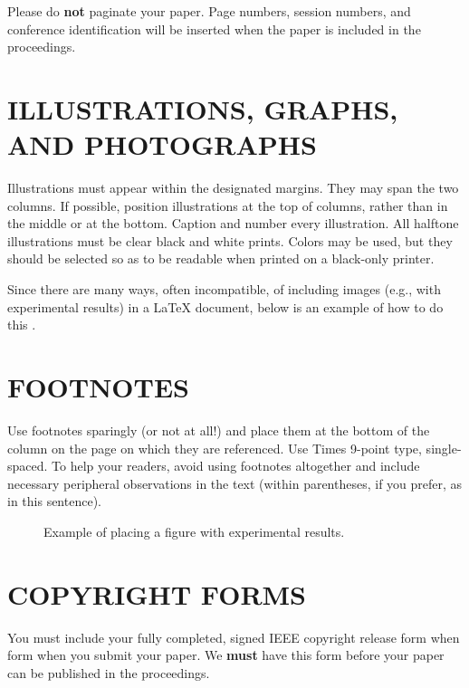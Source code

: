 \documentclass{article}
\begin{document}
Please do {\bf not} paginate your paper.  Page numbers, session numbers, and
conference identification will be inserted when the paper is included in the
proceedings.

\section{ILLUSTRATIONS, GRAPHS, AND PHOTOGRAPHS}
\label{sec:illust}

Illustrations must appear within the designated margins.  They may span the two
columns.  If possible, position illustrations at the top of columns, rather
than in the middle or at the bottom.  Caption and number every illustration.
All halftone illustrations must be clear black and white prints.  Colors may be
used, but they should be selected so as to be readable when printed on a
black-only printer.

Since there are many ways, often incompatible, of including images (e.g., with
experimental results) in a LaTeX document, below is an example of how to do
this \cite{Lamp86}.

\section{FOOTNOTES}
\label{sec:foot}

Use footnotes sparingly (or not at all!) and place them at the bottom of the
column on the page on which they are referenced. Use Times 9-point type,
single-spaced. To help your readers, avoid using footnotes altogether and
include necessary peripheral observations in the text (within parentheses, if
you prefer, as in this sentence).

\begin{figure}[htb]
%
\caption{Example of placing a figure with experimental results.}
\label{fig:res}
%
\end{figure}



\section{COPYRIGHT FORMS}
\label{sec:copyright}

You must include your fully completed, signed IEEE copyright release form when
form when you submit your paper. We {\bf must} have this form before your paper
can be published in the proceedings.



\end{document}
